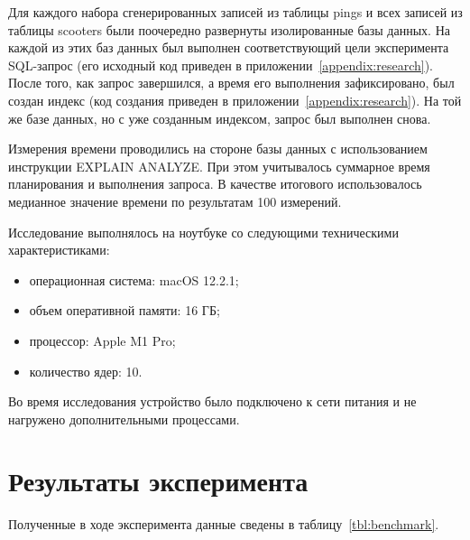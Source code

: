 Для каждого набора сгенерированных записей из таблицы pings и всех записей из таблицы scooters были поочередно развернуты изолированные базы данных. На каждой из этих баз данных был выполнен соответствующий цели эксперимента SQL-запрос (его исходный код приведен в приложении~\ref{appendix:research}). После того, как запрос завершился, а время его выполнения зафиксировано, был создан индекс (код создания приведен в приложении~\ref{appendix:research}). На той же базе данных, но с уже созданным индексом, запрос был выполнен снова.

Измерения времени проводились на стороне базы данных с использованием инструкции EXPLAIN ANALYZE. При этом учитывалось суммарное время планирования и выполнения запроса. В качестве итогового использовалось медианное значение времени по результатам 100 измерений.

Исследование выполнялось на ноутбуке со следующими техническими характеристиками:

\begin{itemize}
    \item операционная система: macOS 12.2.1;
    \item объем оперативной памяти: 16 ГБ;
    \item процессор: Apple M1 Pro;
    \item количество ядер: 10.
\end{itemize}

Во время исследования устройство было подключено к сети питания и не нагружено дополнительными процессами.

\pagebreak
\section{Результаты эксперимента}

Полученные в ходе эксперимента данные сведены в таблицу~\ref{tbl:benchmark}.

